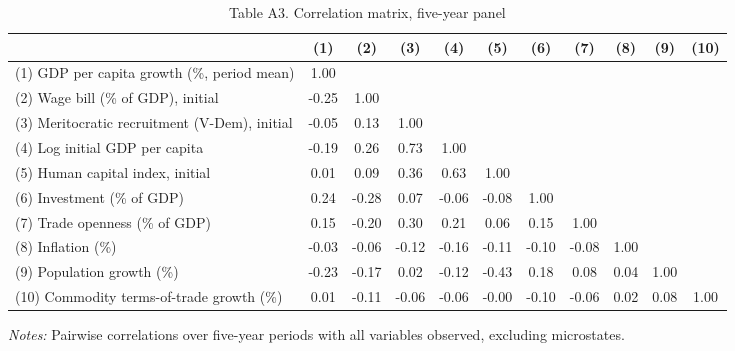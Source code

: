 \begin{table}[htbp]\centering\footnotesize
\providecommand{\sym}[1]{\ensuremath{^{#1}}}
\caption{Table A3. Correlation matrix, five-year panel}\label{tab:TableA3_correlations}
\begin{tabular}{l*{10}{c}}
\toprule
 & (1) & (2) & (3) & (4) & (5) & (6) & (7) & (8) & (9) & (10) \\
\midrule
(1) GDP per capita growth (\%, period mean) & 1.00 &  &  &  &  &  &  &  &  &  \\
(2) Wage bill (\% of GDP), initial & -0.25 & 1.00 &  &  &  &  &  &  &  &  \\
(3) Meritocratic recruitment (V-Dem), initial & -0.05 & 0.13 & 1.00 &  &  &  &  &  &  &  \\
(4) Log initial GDP per capita & -0.19 & 0.26 & 0.73 & 1.00 &  &  &  &  &  &  \\
(5) Human capital index, initial & 0.01 & 0.09 & 0.36 & 0.63 & 1.00 &  &  &  &  &  \\
(6) Investment (\% of GDP) & 0.24 & -0.28 & 0.07 & -0.06 & -0.08 & 1.00 &  &  &  &  \\
(7) Trade openness (\% of GDP) & 0.15 & -0.20 & 0.30 & 0.21 & 0.06 & 0.15 & 1.00 &  &  &  \\
(8) Inflation (\%) & -0.03 & -0.06 & -0.12 & -0.16 & -0.11 & -0.10 & -0.08 & 1.00 &  &  \\
(9) Population growth (\%) & -0.23 & -0.17 & 0.02 & -0.12 & -0.43 & 0.18 & 0.08 & 0.04 & 1.00 &  \\
(10) Commodity terms-of-trade growth (\%) & 0.01 & -0.11 & -0.06 & -0.06 & -0.00 & -0.10 & -0.06 & 0.02 & 0.08 & 1.00 \\
\bottomrule
\end{tabular}
\begin{minipage}{0.95\linewidth}\vspace{4pt}\scriptsize \textit{Notes:} Pairwise correlations over five-year periods with all variables observed, excluding microstates.\end{minipage}
\end{table}
